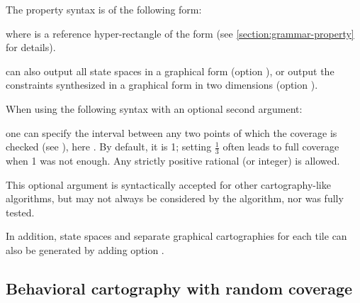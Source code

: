 The property syntax is of the following form:



\noindent{}
where  is a reference hyper-rectangle of the form  (see \cref{section:grammar-property} for details).


\imitator{} can also
output all state spaces in a graphical form (option ),
or
output the constraints synthesized in a graphical form in two dimensions (option ).

When using the following syntax with an optional second argument:


\noindent one can specify the interval between any two points of which the coverage is checked (see \cite{AF10}), here .
By default, it is 1; setting $\frac{1}{3}$ often leads to full coverage when 1 was not enough.
Any strictly positive rational (or integer) is allowed.

\begin{becareful}
	This optional argument is syntactically accepted for other cartography-like algorithms, but may not always be considered by the algorithm, nor was fully tested.
\end{becareful}

In addition, state spaces and separate graphical cartographies for each tile can also be generated by adding option .




\subsection*{Behavioral cartography with random coverage}\label{sss:mode:BC:random}

